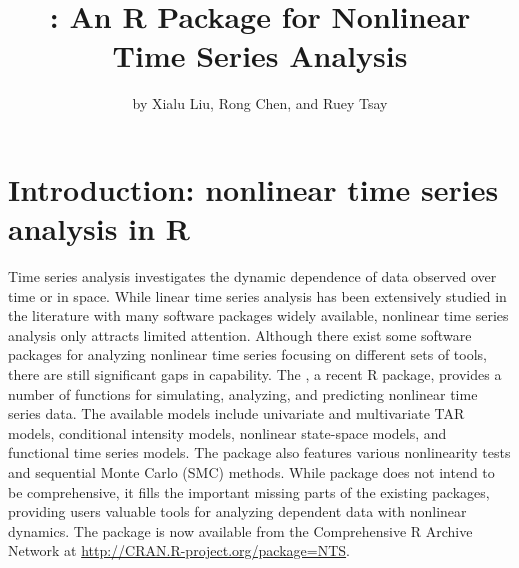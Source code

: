 \title{: An {R} Package for Nonlinear Time Series Analysis}
\author{by Xialu Liu, Rong Chen, and Ruey Tsay}

\maketitle


\section{Introduction: nonlinear time series analysis in R}



Time series analysis investigates the dynamic dependence of data observed over time or in space. While linear time series analysis has been extensively studied in the literature with many software packages widely available, nonlinear time series analysis only attracts limited attention. Although there exist some software packages for analyzing nonlinear time series focusing on different sets of tools, there are still significant gaps in capability. The  \citep{RNTS}, a recent {R} package, provides a number of functions for simulating, analyzing, and predicting nonlinear time series data. The available models include univariate and multivariate TAR models, conditional intensity models,
nonlinear state-space models, and functional time series models. The package also features various nonlinearity tests and sequential Monte Carlo (SMC) methods. While  package does not intend to be comprehensive, it fills the important missing parts of the existing packages, providing users valuable tools for analyzing dependent data with nonlinear dynamics. The package is now available from the Comprehensive {R} Archive Network at \url{http://CRAN.R-project.org/package=NTS}.

